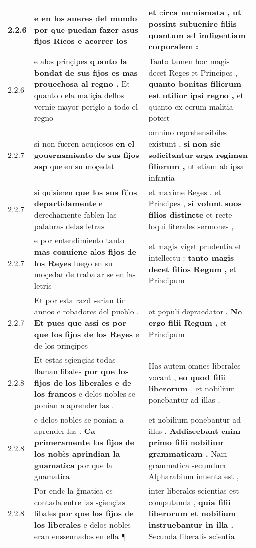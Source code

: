 \begin{tabular}{|p{1cm}|p{6.5cm}|p{6.5cm}|}
2.2.6 & e en los aueres del mundo \textbf{ por que puedan fazer asus fijos Ricos } e acorrer los & et circa numismata , \textbf{ ut possint subuenire filiis } quantum ad indigentiam corporalem : \\\hline
2.2.6 & e alos prinçipes \textbf{ quanto la bondat de sus fijos es mas prouechosa al regno . } Et quanto dela maliçia dellos vernie mayor periglo a todo el regno & Tanto tamen hoc magis decet Reges et Principes , \textbf{ quanto bonitas filiorum est utilior ipsi regno , } et quanto ex eorum malitia potest \\\hline
2.2.7 & si non fueren acuçiosos \textbf{ en el gouernamiento de sus fijos asp } que en su moçedat & omnino reprehensibiles existunt , \textbf{ si non sic solicitantur erga regimen filiorum , } ut etiam ab ipsa infantia \\\hline
2.2.7 & si quisieren \textbf{ que los sus fijos departidamente } e derechamente fablen las palabras delas letras & et maxime Reges , et Principes , \textbf{ si volunt suos filios distincte } et recte loqui literales sermones , \\\hline
2.2.7 & e por entendimiento tanto \textbf{ mas conuiene alos fijos de los Reyes } luego en su moçedat de trabaiar se en las letris & et magis viget prudentia et intellectu : \textbf{ tanto magis decet filios Regum , } et Principum \\\hline
2.2.7 & Et por esta razd̃ serian tir annos e robadores del pueblo . \textbf{ Et pues que assi es por que los fijos de los Reyes } e de los prinçipes & et populi depraedator . \textbf{ Ne ergo filii Regum , } et Principum \\\hline
2.2.8 & Et estas sçiençias todas llaman libales \textbf{ por que los fijos de los liberales e de los francos } e delos nobles se ponian a aprender las . & Has autem omnes liberales vocant , \textbf{ eo quod filii liberorum , } et nobilium ponebantur ad illas . \\\hline
2.2.8 & e delos nobles se ponian a aprender las . \textbf{ Ca primeramente los fijos de los nobłs aprindian la guamatica } por que la guamatica & et nobilium ponebantur ad illas . \textbf{ Addiscebant enim primo filii nobilium grammaticam . } Nam grammatica secundum Alpharabium inuenta est , \\\hline
2.2.8 & Por ende la g̃matica es contada entre las sçiençias libales \textbf{ por que los fijos de los liberales } e delos nobles eran enssennados en ella ¶ & inter liberales scientias est computanda , \textbf{ quia filii liberorum et nobilium instruebantur in illa . } Secunda liberalis scientia \\\hline

\end{tabular}
